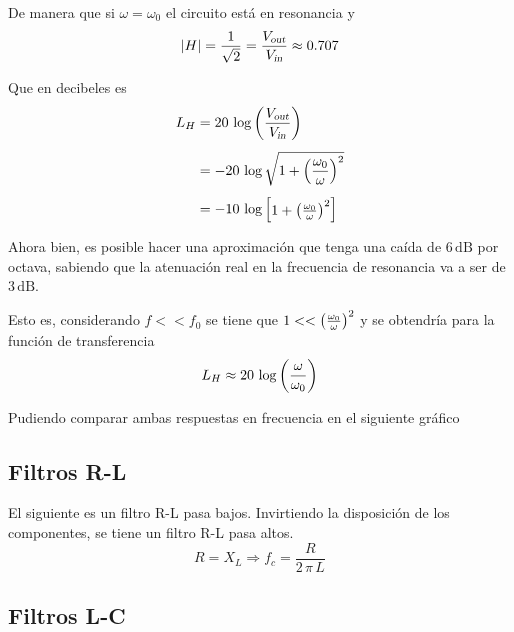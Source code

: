 \documentclass[a5paper,12pt,twoside]{book}
\begin{document}
De manera que si $\omega = \omega_0$ el circuito está en resonancia y
\begin{equation*}
    {\left| {H} \right|} = \frac{1}{\sqrt{2}} = \frac{{{V}_\textsl{{out}}}}{{{V}_\textsl{{in}}}} \approx 0.707
\end{equation*}

Que en decibeles es
\begin{align*}
    L_H &= 20 \, \log \left(\frac{{{V}_\textsl{{out}}}}{{{V}_\textsl{{in}}}}\right)
    \\[1ex]
    &= -20 \, \log \sqrt{1 + \left(\frac{\omega_0}{\omega}\right)^2}
    \\[1ex]
    &= -10 \, \log { \begin{bmatrix} 1 + \left(\frac{\omega_0}{\omega}\right)^2 \end{bmatrix} }
\end{align*}

Ahora bien, es posible hacer una aproximación que tenga una caída de $6 \, \si{\deci \bel}$ por octava, sabiendo que la atenuación real en la frecuencia de resonancia va a ser de $3 \, \si{\deci \bel}$.

Esto es, considerando $f << f_0$ se tiene que $1 << \left(\tfrac{\omega_0}{\omega}\right)^2$ y se obtendría para la función de transferencia
\begin{equation*}
    L_H \approx 20 \, \log \left(\frac{\omega}{\omega_0}\right)
\end{equation*}

Pudiendo comparar ambas respuestas en frecuencia en el siguiente gráfico

\begin{center}
    \def\svgwidth{\linewidth}
    
\end{center}


\subsection{Filtros R-L}

El siguiente es un filtro R-L pasa bajos. Invirtiendo la disposición de los componentes, se tiene un filtro R-L pasa altos.
\begin{equation*}
    R = X_L \Rightarrow f_c = \frac{R}{2 \, \pi \, L}
\end{equation*}

\begin{center}
    \def\svgwidth{0.6\linewidth}
    
\end{center}


\subsection{Filtros L-C}
\end{document}
